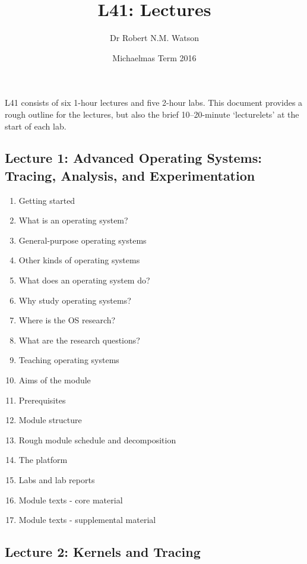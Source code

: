 \documentclass[a4paper,10pt]{article}
\begin{document}
\title{L41: Lectures}
\author{Dr Robert N.M. Watson}
\date{Michaelmas Term 2016}
\maketitle

\noindent
L41 consists of six 1-hour lectures and five 2-hour labs.
This document provides a rough outline for the lectures, but also the brief
10--20-minute `lecturelets' at the start of each lab.

\subsection*{Lecture 1: Advanced Operating Systems: Tracing, Analysis, and
  Experimentation}

\begin{enumerate}
  \item Getting started
  \item What is an operating system?
  \item General-purpose operating systems
  \item Other kinds of operating systems
  \item What does an operating system do?
  \item Why study operating systems?
  \item Where is the OS research?
  \item What are the research questions?
  \item Teaching operating systems
  \item Aims of the module
  \item Prerequisites
  \item Module structure
  \item Rough module schedule and decomposition
  \item The platform
  \item Labs and lab reports
  \item Module texts - core material
  \item Module texts - supplemental material
\end{enumerate}

\subsection*{Lecture 2: Kernels and Tracing}
\end{document}

